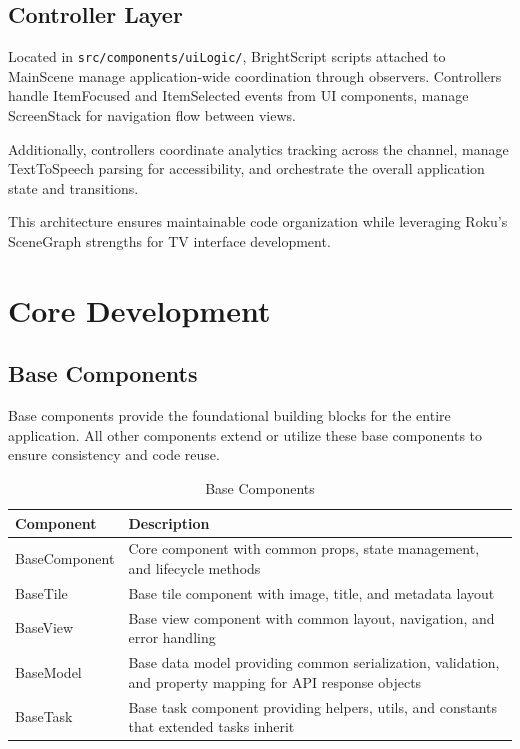 \documentclass[11pt,letterpaper]{article}
\begin{document}
\subsection{Controller Layer}
Located in \texttt{src/components/uiLogic/}, BrightScript scripts attached to MainScene manage application-wide coordination through observers. Controllers handle ItemFocused and ItemSelected events from UI components, manage ScreenStack for navigation flow between views.

Additionally, controllers coordinate analytics tracking across the channel, manage TextToSpeech parsing for accessibility, and orchestrate the overall application state and transitions.

This architecture ensures maintainable code organization while leveraging Roku's SceneGraph strengths for TV interface development.


\section{Core Development}
\label{sec:ui-components}

\subsection{Base Components}
\label{sec:base-components}

Base components provide the foundational building blocks for the entire application. All other components extend or utilize these base components to ensure consistency and code reuse.

\begin{table}[H]
\centering
\scriptsize
\begin{tabular}{@{}p{}p{}@{}}
\toprule
\textbf{Component} & \textbf{Description} \\
\midrule
BaseComponent & Core component with common props, state management, and lifecycle methods \\
BaseTile & Base tile component with image, title, and metadata layout \\
BaseView & Base view component with common layout, navigation, and error handling \\
BaseModel & Base data model providing common serialization, validation, and property mapping for API response objects \\
BaseTask & Base task component providing helpers, utils, and constants that extended tasks inherit \\
\bottomrule
\end{tabular}
\caption{\small Base Components}
\label{tab:base-components}
\end{table}
\end{document}

